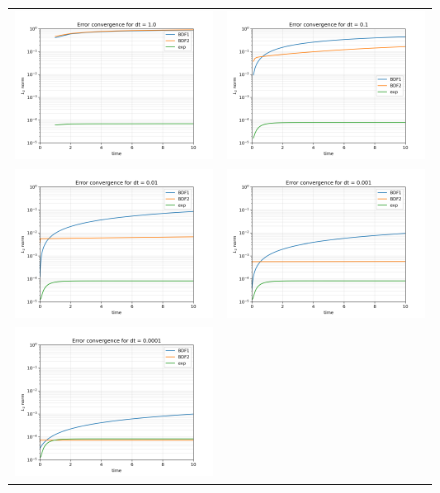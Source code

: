 \documentclass[11pt, spanish]{article}
\begin{document}
\begin{figure}[H]
	\centering
	\begin{tabular}{cc}
		\includegraphics[width=0.5\linewidth]{res/no_homogeneo/L2norm_dt_1.0}
		&   \includegraphics[width=0.5\linewidth]{res/no_homogeneo/L2norm_dt_0.1}
		\\
		\includegraphics[width=0.5\linewidth]{res/no_homogeneo/L2norm_dt_0.01}
		&   \includegraphics[width=0.5\linewidth]{res/no_homogeneo/L2norm_dt_0.001}
		\\
		\includegraphics[width=0.5\linewidth]{res/no_homogeneo/L2norm_dt_0.0001}

\end{tabular}
\end{figure}
\end{document}
